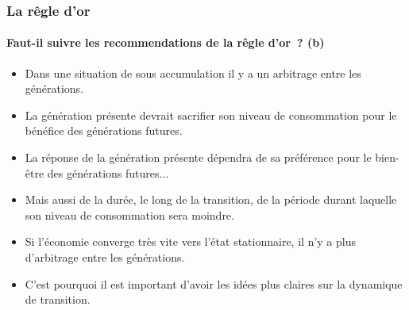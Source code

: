 \documentclass[10pt,notheorems]{beamer}
\theoremstyle{plain}
\theoremstyle{definition} %
\begin{document}
\begin{frame}
  \frametitle{La rêgle d'or}
  \framesubtitle{Faut-il suivre les recommendations de la rêgle d'or~? (b)}

  \bigskip

  \begin{itemize}

  \item Dans une situation de sous accumulation il y a un arbitrage entre les générations.\newline

  \item La génération présente devrait sacrifier son niveau de consommation pour le bénéfice des générations futures.\newline

  \item La réponse de la génération présente dépendra de sa préférence pour le bien-être des générations futures...\newline

  \item Mais aussi de la durée, le long de la transition, de la période durant laquelle son niveau de consommation sera moindre.\newline

  \item Si l'économie converge très vite vers l'état stationnaire, il n'y a plus d'arbitrage entre les générations.\newline

  \item C'est pourquoi il est important d'avoir les idées plus claires sur la dynamique de transition.

  \end{itemize}

\end{frame}
\end{document}
